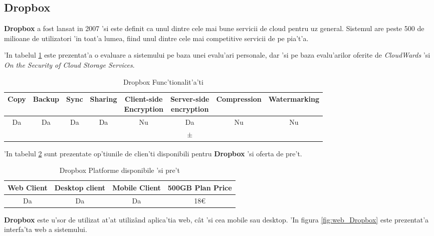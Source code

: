 \documentclass[12pt,a4paper,twoside]{report}
\newcommand{\greencheck}{\color{green}  \ding{51}}
\newcommand{\orangepm}{\color{orange} \textbf{$\pm$}}
\newcommand{\redxmark}{\color{red} \ding{55}}
\begin{document}
\subsection{Dropbox} \label{dropbox}


\textbf{Dropbox} a fost lansat in 2007 'si este definit ca unul dintre cele mai bune servicii de cloud pentru uz general\cite{cloudwards_best}. Sistemul are peste 500 de milioane de utilizatori 'in toat'a lumea, fiind unul dintre cele mai competitive servicii de pe pia't'a. 

'In tabelul \ref{table:dropboxfeaturetable} este prezentat'a o evaluare a sistemului pe baza unei evalu'ari personale, dar 'si pe baza evalu'arilor oferite de \textit{CloudWards}\cite{cloudwards_best} 'si \textit{On the Security of Cloud Storage Services}\cite{cloudstoragecomparison}.
\begin{table}[H]
\small
\centering
\caption{Dropbox Func'tionalit'a'ti}
\begin{tabular}{|c|c|c|c|c|c|c|c|}          
\hline               
Copy & Backup & Sync & Sharing & \makecell{Client-side\\ Encryption} & \makecell{Server-side \\ encryption} & Compression & Watermarking \\ [0.5ex]   
\hline 
Da & Da & Da & Da & Nu &  Da  & Nu & Nu    \\                      
\greencheck & \greencheck & \greencheck & \greencheck\greencheck & \redxmark\redxmark & \orangepm &  \redxmark\redxmark &  \redxmark\redxmark  \\               
\hline                              
\end{tabular}
\label{table:dropboxfeaturetable}             
\end{table}
'In tabelul \ref{table:dropboxsystemtable} sunt prezentate op'tiunile de clien'ti disponibili pentru \textbf{Dropbox} 'si oferta de pre't.
\begin{table}[H]
\centering
\caption{Dropbox Platforme disponibile 'si pre't}
\begin{tabular}{|c|c|c|c|}          
\hline                      
 Web Client & Desktop client & Mobile Client & 500GB Plan Price\\ [0.5ex]   
\hline                            
Da & Da & Da & 18\euro \\               
\hline                              
\end{tabular}
\label{table:dropboxsystemtable}             
\end{table}
\textbf{Dropbox} este u'sor de utilizat at'at utilizând aplica'tia web, cât 'si cea mobile sau desktop. 'In figura \ref{fig:web_Dropbox} este prezentat'a interfa'ta web a sistemului.
\end{document}

